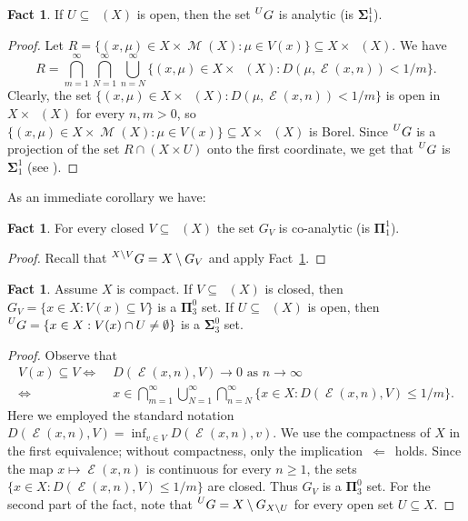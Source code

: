 \documentclass{amsart}
\theoremstyle{definition}
\newtheorem{fact}[thm]{Fact}
\newcommand{\bs}{\boldsymbol{\Sigma}}
\newcommand{\bp}{\boldsymbol{\Pi}}
\newcommand{\bP}{\boldsymbol{\Pi}}
\newcommand{\bS}{\boldsymbol{\Sigma}}
\DeclareMathOperator{\Emp}{\mathcal{E}}%
\DeclareMathOperator{\M}{\mathcal{M}}
\DeclareMathOperator{\MT}{\mathcal{M}_{\mathit T} }
\begin{document}
\begin{fact}\label{fact:UG-analytic}If $U\subseteq \MT(X)$ is open, then the set
$\prescript{U}{}G$ is analytic (is $\bs^1_1$).%
\end{fact}
\begin{proof}
Let $R=\{(x,\mu)\in X\times \M(X):\mu\in V(x)\}\subseteq X\times\MT(X)$. We have
\[
R=\bigcap_{m=1}^\infty \bigcap_{N=1}^\infty \bigcup_{n=N}^\infty \{(x,\mu) \in X\times \MT(X) :D(\mu,\Emp(x,n))<1/m\}.
\]
Clearly, the set $\{(x,\mu) \in X\times \MT(X) :D(\mu,\Emp(x,n))<1/m\}$ is open in $X\times\MT(X)$ for every $n,m>0$, so $\{(x,\mu)\in X\times \M(X):\mu\in V(x)\}\subseteq X\times\MT(X)$ is Borel.
Since $\prescript{U}{}G$ is a projection of the set $R\cap (X\times U)$ %
onto the first coordinate, we get that $\prescript{U}{}G$ is $\bs^1_1$ (see \cite[p. 86]{Kechris}).
\end{proof}
As an immediate corollary we have:

\begin{fact}\label{GV_co-analytic}For every closed $V\subseteq \MT(X)$ the set $G_V$ is co-analytic (is $\bp^1_1$).
\end{fact}
\begin{proof}
Recall that  $\prescript{X \setminus V}{} G = X \setminus  G_{V} $ and apply Fact~\ref{fact:UG-analytic}.
\end{proof}



\begin{fact} \label{upper:UG}
Assume $X$ is compact. If $V\subseteq \MT(X)$ is closed, then
$G_V=\{x\in X\colon V(x)\subseteq V\}$ is a $\bP^0_3$ set.
If $U \subseteq \MT(X)$ is open, then $\prescript{U}{} G = \{x\in X: V(x)\cap U\neq\emptyset\}$ is a $\bS^0_3$ set.
\end{fact}

\begin{proof}
Observe that
\begin{align*}
V(x) \subseteq V \Leftrightarrow & \;
D(\Emp(x, n), V) \to 0 \textrm{ as } n \to \infty \\
\Leftrightarrow & \;
x \in \bigcap_{m = 1}^\infty
\bigcup_{N = 1}^\infty
\bigcap_{n = N}^\infty
\{ x \in X : D(\Emp(x, n), V) \le 1/m \}.
\end{align*}
Here we employed the standard notation $D(\Emp(x, n), V) = \inf_{v \in V} D(\Emp(x, n), v)$. We use the compactness of $X$ in the first equivalence; without compactness, only the implication~$\Leftarrow$~holds.  Since the map $x \mapsto \Emp(x, n)$ is continuous for every $n \geq 1$, the sets $\{ x \in X : D(\Emp(x, n), V) \le 1/m \}$ are closed. Thus $G_V$ is a $\bP^0_3$ set. For the second part of the fact, note that $\prescript{U}{} G = X \setminus  G_{X \setminus U}$ for every open set $U\subseteq X$.
\end{proof}
\end{document}
